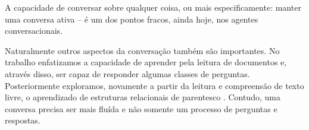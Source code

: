 %
%

A capacidade de conversar sobre qualquer coisa, ou mais
especificamente: manter uma conversa ativa -- é um dos pontos fracos,
ainda hoje, nos agentes conversacionais.

Naturalmente outros aspectos da conversação também são importantes. No
trabalho \citep*{eliasOliveira-isda2020} enfatizamos a capacidade de
aprender pela leitura de documentos e, através disso, ser capaz de
responder algumas classes de perguntas. Posteriormente exploramos,
novamente a partir da leitura e compreensão de texto livre, o
aprendizado de estruturas relacionais de
parentesco \citep*{eliasOliveira-lala2021}. Contudo, uma conversa
precisa ser mais fluída e não somente um processo de perguntas e
respostas.
